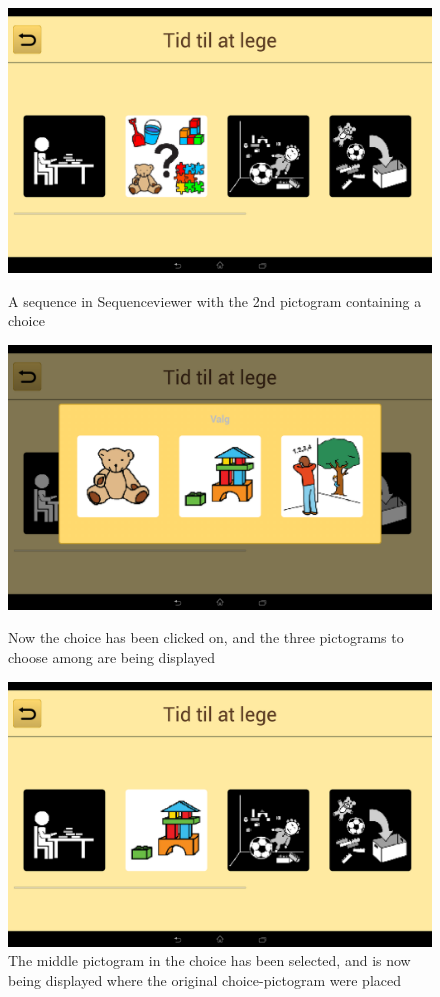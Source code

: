 \begin{figure}[H]
	\centering
	\includegraphics[scale=0.12]{Pics/Sprint4/choice1noBtn.png}
	\caption{A sequence in Sequenceviewer with the 2nd pictogram containing a choice}
	\label{fig:choicepic1}
	
	\includegraphics[scale=0.12]{Pics/Sprint4/choice2noBtn.png}
	\caption{Now the choice has been clicked on, and the three pictograms to choose among are being displayed}
	\label{fig:choicepic2}
	
	\includegraphics[scale=0.12]{Pics/Sprint4/choice3noBtn.png}
	\caption{The middle pictogram in the choice has been selected, and is now being displayed where the original choice-pictogram were placed}
	\label{fig:choicepic3}
\end{figure}


